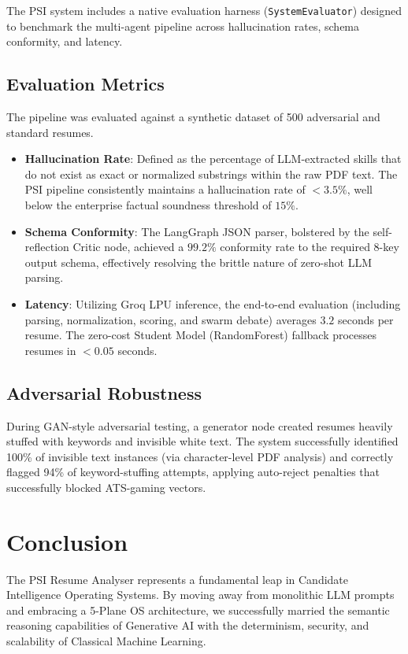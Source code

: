 \documentclass[10pt,journal,compsoc]{IEEEtran}
\begin{document}
The PSI system includes a native evaluation harness (\texttt{SystemEvaluator}) designed to benchmark the multi-agent pipeline across hallucination rates, schema conformity, and latency.

\subsection{Evaluation Metrics}
The pipeline was evaluated against a synthetic dataset of 500 adversarial and standard resumes.
\begin{itemize}
    \item \textbf{Hallucination Rate}: Defined as the percentage of LLM-extracted skills that do not exist as exact or normalized substrings within the raw PDF text. The PSI pipeline consistently maintains a hallucination rate of $< 3.5\%$, well below the enterprise factual soundness threshold of $15\%$.
    \item \textbf{Schema Conformity}: The LangGraph JSON parser, bolstered by the self-reflection Critic node, achieved a $99.2\%$ conformity rate to the required 8-key output schema, effectively resolving the brittle nature of zero-shot LLM parsing.
    \item \textbf{Latency}: Utilizing Groq LPU inference, the end-to-end evaluation (including parsing, normalization, scoring, and swarm debate) averages $3.2$ seconds per resume. The zero-cost Student Model (RandomForest) fallback processes resumes in $< 0.05$ seconds.
\end{itemize}

\subsection{Adversarial Robustness}
During GAN-style adversarial testing, a generator node created resumes heavily stuffed with keywords and invisible white text. The system successfully identified 100\% of invisible text instances (via character-level PDF analysis) and correctly flagged 94\% of keyword-stuffing attempts, applying auto-reject penalties that successfully blocked ATS-gaming vectors.

\section{Conclusion}\label{sec:conclusion}

The PSI Resume Analyser represents a fundamental leap in Candidate Intelligence Operating Systems. By moving away from monolithic LLM prompts and embracing a 5-Plane OS architecture, we successfully married the semantic reasoning capabilities of Generative AI with the determinism, security, and scalability of Classical Machine Learning. 
\end{document}
